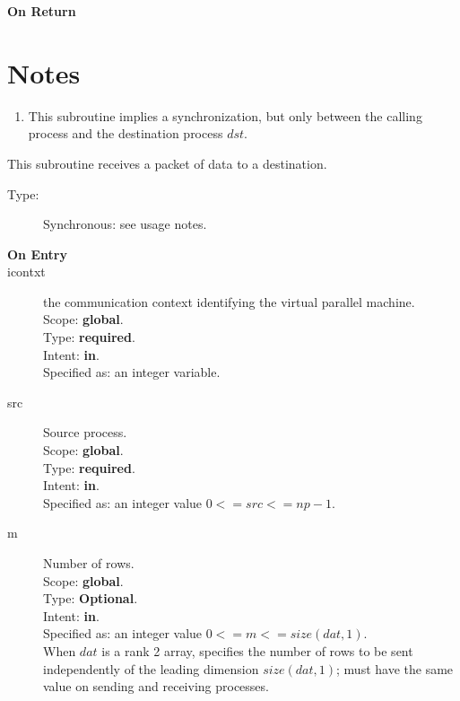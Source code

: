 \begin{description}
\item[\bf On Return]
\end{description}

\section*{Notes}
\begin{enumerate}
\item This subroutine implies a synchronization, but only between the
  calling process and the destination  process $dst$.
\end{enumerate}




This subroutine receives a packet of data to a destination.
\begin{description}
\item[Type:] Synchronous: see usage notes.
\item[\bf  On Entry ]
\item[icontxt] the communication context identifying the virtual
  parallel machine.\\
Scope: {\bf global}.\\
Type: {\bf required}.\\
Intent: {\bf in}.\\
Specified as: an integer variable.
\item[src] Source process.\\
Scope: {\bf global}.\\
Type: {\bf required}.\\
Intent: {\bf in}.\\
Specified as: an integer value $0<= src <= np-1$. \\
\item[m] Number of rows.\\
Scope: {\bf global}.\\
Type: {\bf Optional}.\\
Intent: {\bf in}.\\
Specified as: an integer value $0<= m <= size(dat,1)$. \\
When $dat$ is a rank 2 array, specifies the number of rows to be sent
independently of the leading dimension $size(dat,1)$; must have the
same value on sending and receiving processes.
\end{description}


